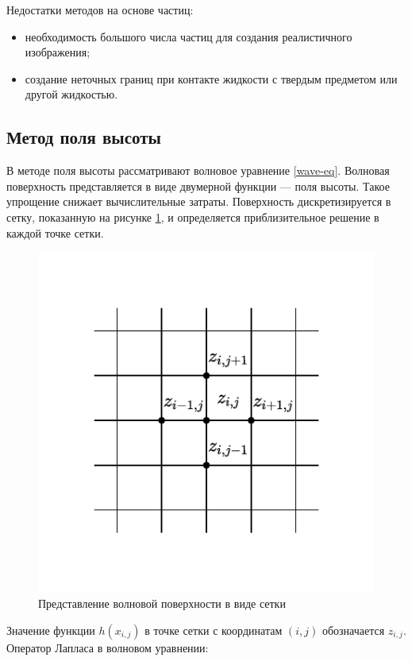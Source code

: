 Недостатки методов на основе частиц:
\begin{itemize}
	\item необходимость большого числа частиц для создания реалистичного изображения;
	\item создание неточных границ при контакте жидкости с твердым предметом или другой жидкостью.
\end{itemize} 

\subsection{Метод поля высоты}

В методе поля высоты рассматривают волновое уравнение \ref{wave-eq}. Волновая поверхность представляется в виде двумерной функции --- поля высоты. Такое упрощение снижает вычислительные затраты. Поверхность дискретизируется в сетку, показанную на рисунке \ref{img:grid}, и определяется приблизительное решение в каждой точке сетки.

\begin{figure}[H]
	\begin{center}
		\includegraphics[scale=0.9]{img/grid.pdf}
	\end{center}
	\captionsetup{justification=centering}
	\caption{Представление волновой поверхности в виде сетки}
	\label{img:grid}
\end{figure}

Значение функции $h(x_{i,j})$ в точке сетки с координатам $(i,j)$ обозначается $z_{i,j}$. Оператор Лапласа в волновом уравнении:

